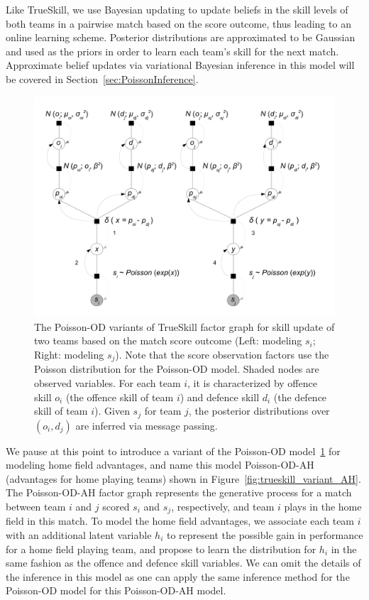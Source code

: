 \unindentmore Like TrueSkill, we use Bayesian updating to update beliefs in the
skill levels of both teams in a pairwise match based on the score
outcome, thus leading to an online learning scheme.  Posterior
distributions are approximated to be Gaussian and used as the
priors in order to learn each team's skill for the next match.
Approximate belief updates via variational Bayesian inference in this model
will be covered in Section~\ref{sec:PoissonInference}.
%
\begin{figure}[t!]
\centerline{\includegraphics[scale=0.35]{modelAndInference}}
\caption{
The Poisson-OD variants of TrueSkill factor graph for skill update of two teams based on the match score outcome (Left: modeling $s_i$; Right: modeling $s_j$). Note that the score observation factors use the Poisson distribution for the Poisson-OD model. Shaded nodes are observed variables. For each team $i$, it is characterized by offence skill $o_{i}$ (the offence skill of team $i$) and defence skill $d_{i}$ (the defence skill of
team $i$). Given $s_j$ for team $j$, the posterior distributions over $(o_i,d_j)$ are inferred via message passing.
}
\label{fig:trueskill_variant}
\end{figure}

We pause at this point to introduce a variant of the Poisson-OD model~\ref{fig:trueskill_variant} for modeling home field advantages, and name this model Poisson-OD-AH (advantages for home playing teams) shown in Figure~\ref{fig:trueskill_variant_AH}. The Poisson-OD-AH factor graph represents the generative process for a match between team $i$ and $j$ scored $s_i$ and $s_j$, respectively, and team $i$ plays in the home field in this match. To model the home field advantages, we associate each team $i$ with an additional latent variable $h_i$ to represent the possible gain in performance for a home field playing team, and propose to learn the distribution for $h_i$ in the same fashion as the offence and defence skill variables. We can omit the details of the inference in this model as one can apply the same inference method for the Poisson-OD model for this Poisson-OD-AH model. 

